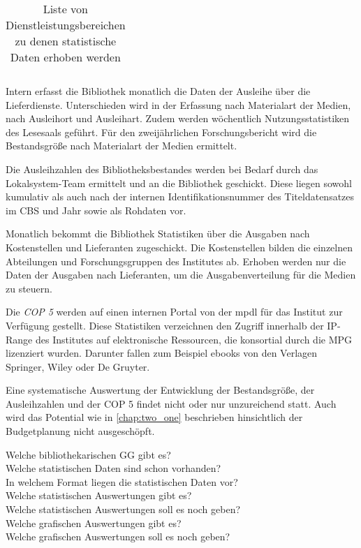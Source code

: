 \begin{table}[h]
\begin{adjustbox}{max width=\textwidth}
\begin{tabular}{llclllcc}
        \bottomrule
    \end{tabular}
    \end{adjustbox}
    \caption{%
        Liste von Dienstleistungsbereichen zu denen statistische Daten erhoben werden
    \label{tab:Statistische_Daten}
    }
     \end{table}
\endgroup


Intern erfasst die Bibliothek monatlich die Daten der Ausleihe über die Lieferdienste. Unterschieden 
wird in der Erfassung nach Materialart der Medien, nach Ausleihort und Ausleihart. Zudem werden wöchentlich 
Nutzungsstatistiken des Lesesaals geführt. Für den zweijährlichen Forschungsbericht wird die Bestandsgröße nach 
Materialart der Medien ermittelt.

Die Ausleihzahlen des Bibliotheksbestandes werden bei Bedarf durch das Lokalsystem-Team ermittelt und an die Bibliothek geschickt. 
Diese liegen sowohl kumulativ als auch nach der internen Identifikationsnummer des Titeldatensatzes im \acrshort{CBS} 
und Jahr sowie als Rohdaten vor. 

Monatlich bekommt die Bibliothek Statistiken über die Ausgaben nach Kostenstellen und Lieferanten zugeschickt. 
Die Kostenstellen bilden die einzelnen Abteilungen und Forschungsgruppen des Institutes ab. 
Erhoben werden nur die Daten der Ausgaben nach Lieferanten, um die Ausgabenverteilung für die Medien zu steuern. 

Die \textit{\acrfull{COP 5}} werden auf einen internen Portal von der \acrshort{mpdl} für das Institut zur Verfügung gestellt.
Diese Statistiken verzeichnen den Zugriff innerhalb der IP-Range des Institutes auf elektronische Ressourcen, 
die konsortial durch die \acrshort{MPG} lizenziert wurden. Darunter fallen zum Beispiel ebooks von den Verlagen 
Springer, Wiley oder De Gruyter. 

Eine systematische Auswertung der Entwicklung der Bestandsgröße, der Ausleihzahlen und der \acrshort{COP 5} findet nicht
oder nur unzureichend statt. Auch wird das Potential wie in \autoref{chap:two_one} beschrieben hinsichtlich der Budgetplanung
nicht ausgeschöpft.



\clearpage
Welche bibliothekarischen GG gibt es?\\
Welche statistischen Daten sind schon vorhanden?\\
In welchem Format liegen die statistischen Daten vor?\\
Welche statistischen Auswertungen gibt es?\\
Welche statistischen Auswertungen soll es noch geben?\\
Welche grafischen Auswertungen gibt es?\\
Welche grafischen Auswertungen soll es noch geben?



